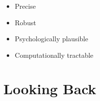 \documentclass[a4paper,landscape,headrule,footrule]{foils}
\begin{document}











\begin{itemize}
\item Precise
\item Robust
\item Psychologically plausible
\item Computationally tractable
\end{itemize}


\section[Looking back: the course, \LaTeX{} and reflection]{Looking Back}
\end{document}
